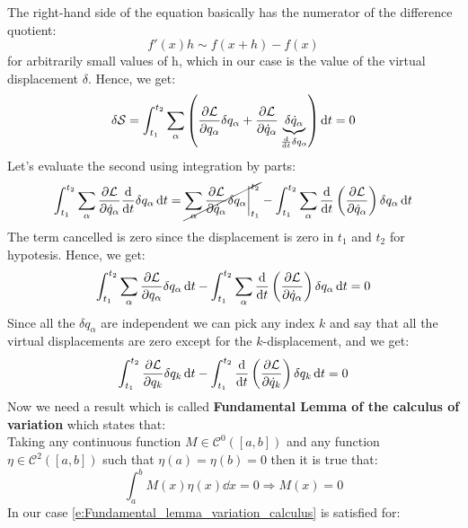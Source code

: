 The right-hand side of the equation basically has the numerator of the difference quotient:
\begin{equation}
    f'(x)h \sim f(x+h) - f(x)
\end{equation}
for arbitrarily small values of h, which in our case is the value of the virtual displacement $\delta$. Hence, we get:
\begin{equation}
    \delta \action = \int_{t_1}^{t_2}\bigsum_{\alpha}\brackets{\pdv{\lagr}{q_{\alpha}}\delta q_{\alpha} + \pdv{\lagr}{\dot{q}_{\alpha}} \underbrace{\delta \dot{q}_{\alpha}}_{\frac{\dd{}}{\dd{t}}\delta q_{\alpha}}} \dd{t} = 0
\end{equation}
Let's evaluate the second using integration by parts:
\begin{equation}
    \int_{t_1}^{t_2}\bigsum_{\alpha}\pdv{\lagr}{\dot{q}_{\alpha}} \dv{}{t}\delta q_{\alpha} \dd{t} = \cancel{\bigsum_{\alpha}\pdv{\lagr}{\dot{q}_{\alpha}} \delta q_{\alpha}\bigg|_{t_1}^{t_2}} - \int_{t_1}^{t_2}\bigsum_{\alpha}\dv{}{t}\brackets{\pdv{\lagr}{\dot{q}_{\alpha}}} \delta q_{\alpha} \dd{t}
\end{equation}
The term cancelled is zero since the displacement is zero in $t_1$ and $t_2$ for hypotesis. Hence, we get:
\begin{equation}
    \int_{t_1}^{t_2}\bigsum_{\alpha}\pdv{\lagr}{q_{\alpha}}\delta q_{\alpha} \dd{t} - \int_{t_1}^{t_2}\bigsum_{\alpha}\dv{}{t}\brackets{\pdv{\lagr}{\dot{q}_{\alpha}}} \delta q_{\alpha} \dd{t} = 0
\end{equation}
Since all the $\delta q_{\alpha}$ are independent we can pick any index $k$ and say that all the virtual displacements are zero except for the $k$-displacement, and we get:
\begin{equation}
    \int_{t_1}^{t_2}\pdv{ \lagr}{ q_{k}}\delta q_{k} \dd{t} - \int_{t_1}^{t_2}\dv{}{t}\brackets{\pdv{ \lagr}{ \dot{q}_{k}}} \delta q_{k} \dd{t} = 0
\end{equation}
Now we need a result which is called \textbf{Fundamental Lemma of the calculus of variation} which states that:\\
Taking any continuous function $M\in\mathcal{C}^0([a,b])$ and any function $\eta \in \mathcal{C}^2([a,b])$ such that $\eta(a) = \eta(b) = 0$ then it is true that:
\begin{equation} \label{e:Fundamental_lemma_variation_calculus}
    \int_{a}^{b}M(x)\eta(x)\dd{x} = 0 \Rightarrow M(x) = 0
\end{equation}
In our case \eqref{e:Fundamental_lemma_variation_calculus} is satisfied for:
